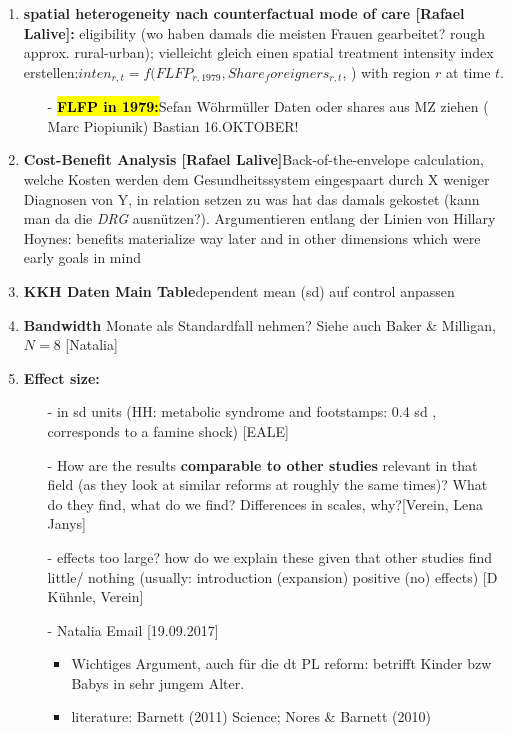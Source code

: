 \documentclass[11pt,a4paper]{article}
\begin{document}
{\begin{enumerate}
\item  \textbf{spatial heterogeneity nach counterfactual mode of care [Rafael Lalive]:} \newline eligibility (wo haben damals die meisten Frauen gearbeitet? rough approx. rural-urban); vielleicht gleich einen spatial treatment intensity index erstellen:\newline $inten_{r,t}=f(FLFP_{r,1979}, Share_foreigners_{r,t}$, ) \newline
with region $r$ at time $t$. 
\begin{itemize}
	\item[-] \textbf{\hl{FLFP in 1979:}}\newline Sefan Wöhrmüller Daten oder shares aus MZ ziehen (	Marc Piopiunik) Bastian 16.OKTOBER!
\end{itemize}


\item \textbf{Cost-Benefit Analysis [Rafael Lalive]}\newline Back-of-the-envelope calculation, welche Kosten werden dem Gesundheitssystem eingespaart durch X weniger Diagnosen von Y, in relation setzen zu was hat das damals gekostet (kann man da die \textit{DRG} ausnützen?). Argumentieren entlang der Linien von Hillary Hoynes: benefits materialize way later and in other dimensions which were early goals in mind


\item \textbf{KKH Daten Main Table}\newline dependent mean (sd) auf control anpassen


\item \textbf{Bandwidth} Monate als Standardfall nehmen? \newline
Siehe auch Baker \& Milligan, $N=8$ [Natalia]


\item \textbf{Effect size:}\vspace{-1em}
\begin{itemize}
	\item[-]in sd units (HH: metabolic syndrome and footstamps: 0.4 sd , corresponds to a famine 	shock) [EALE]
	\item[-] How are the results \textbf{comparable to other studies} relevant in that field (as 	they look at similar reforms at roughly the same times)? What do they find, what do we find? 	Differences in scales, why?[Verein, Lena Janys]
	\item[-] effects too large? how do we explain these given that other studies find little/	nothing (usually: introduction (expansion) positive (no) effects) [D Kühnle, Verein]
	\item[-] Natalia Email [19.09.2017]\vspace{-0.5em}
	\begin{itemize}
		\item Wichtiges Argument, auch für die dt PL reform: betrifft Kinder bzw Babys in sehr 	jungem 	Alter.
		\item literature: Barnett (2011) Science; Nores \& Barnett (2010) 
	\end{itemize}
\end{itemize}



\end{enumerate}}
\end{document}
